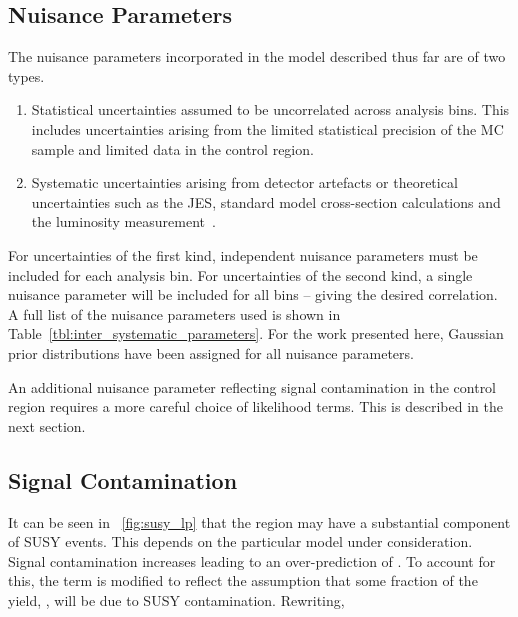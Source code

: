 \subsection{Nuisance Parameters}
The nuisance parameters incorporated in the model described thus far are of two
types.
\begin{enumerate}
\item Statistical uncertainties assumed to be uncorrelated across analysis
  bins. This includes uncertainties arising from the limited statistical
  precision of the \ac{MC} sample and limited data in the control region.
\item Systematic uncertainties arising from detector artefacts or theoretical
  uncertainties such as the \ac{JES}, standard model cross-section calculations
  and the luminosity measurement~\cite{cms_lumi_measurement}.
\end{enumerate}
For uncertainties of the first kind, independent nuisance parameters must be
included for each analysis bin. For uncertainties of the second kind, a single
nuisance parameter will be included for all bins -- giving the desired
correlation. A full list of the nuisance parameters used is shown in
Table~\ref{tbl:inter_systematic_parameters}. For the work presented here,
Gaussian prior distributions have been assigned for all nuisance parameters.



An additional nuisance parameter reflecting signal contamination in the control
region requires a more careful choice of likelihood terms. This is described in
the next section.

\subsection{Signal Contamination}
It can be seen in \fig~\ref{fig:susy_lp} that the region \LPcontrol may have a
substantial component of \ac{SUSY} events. This depends on the particular model
under consideration. Signal contamination increases \NControl leading to an
over-prediction of \NBkg. To account for this, the \NBkgi term is modified to
reflect the assumption that some fraction of the yield, \NControli, will be due
to \ac{SUSY} contamination. Rewriting,

